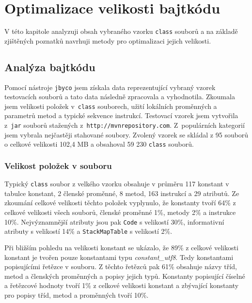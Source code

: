 \chapter{Optimalizace velikosti bajtkódu}\label{Tool}

V této kapitole analyzuji obsah vybraného vzorku \texttt{class} souborů a na základě zjištěných poznatků navrhuji metody pro optimalizaci jejich velikosti. 

\section{Analýza bajtkódu}\label{Analysis}


Pomocí nástroje \texttt{jbyco} jsem získala data reprezentující vybraný vzorek testovacích souborů a tato data následně zpracovala a vyhodnotila. Zkoumala jsem velikosti položek v~\texttt{class} souborech, užití lokálních proměnných a parametrů metod a typické sekvence instrukcí. Testovací vzorek jsem vytvořila z~\texttt{jar} souborů stažených z~\texttt{http://mvnrepository.com}. Z~populárních kategorií jsem vybrala nejčastěji stahované soubory. Zvolený vzorek se skládal z 95 souborů o celkové velikosti 102,4 MB a obsahoval 59 230 \texttt{class} souborů.

\subsection{Velikost položek v souboru}

Typický \texttt{class} soubor z velkého vzorku obsahuje v průměru 117 konstant v tabulce konstant, 2 členské proměnné, 8 metod, 163 instrukcí a 29 atributů. Ze zkoumání celkové velikosti těchto položek vyplynulo, že konstanty tvoří 64\% z celkové velikosti všech souborů, členské proměnné 1\%, metody 2\% a instrukce 10\%.
Nejvýznamnější atributy jsou pak \texttt{Code} s velikostí 30\%, informativní atributy s velikostí 14\% a \texttt{StackMapTable} s velikostí 2\%.

Při bližším pohledu na velikosti konstant se ukázalo, že 89\% z celkové velikosti konstant je tvořen pouze konstantami typu \textit{constant\_utf8}. Tedy konstantami popisujícími řetězce v souboru. Z těchto řetězců pak 61\% obsahuje názvy tříd, metod a členských proměnných a popisy jejich typů. Konstanty popisující číselné a řetězcové hodnoty tvoří 1\% z celkové velikosti konstant a zbývající konstanty pro popisy tříd, metod a proměnných tvoří 10\%.

